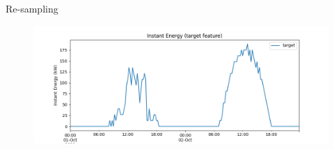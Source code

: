 \begin{frame}{Re-sampling}
    \begin{figure}
        \centering
        \includegraphics[width=\textwidth]{sections/2_preprocessing/imgs/targetfeature15min.png}
    \end{figure}
\end{frame}